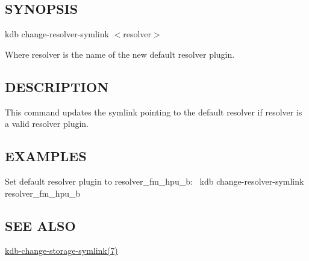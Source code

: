 \subsection*{S\+Y\+N\+O\+P\+S\+IS}

{\ttfamily kdb change-\/resolver-\/symlink $<$resolver$>$}

Where {\ttfamily resolver} is the name of the new default resolver plugin.

\subsection*{D\+E\+S\+C\+R\+I\+P\+T\+I\+ON}

This command updates the symlink pointing to the default resolver if {\ttfamily resolver} is a valid resolver plugin.

\subsection*{E\+X\+A\+M\+P\+L\+ES}

Set default resolver plugin to resolver\+\_\+fm\+\_\+hpu\+\_\+b\+:~\newline
 {\ttfamily kdb change-\/resolver-\/symlink resolver\+\_\+fm\+\_\+hpu\+\_\+b}

\subsection*{S\+EE A\+L\+SO}


\begin{DoxyItemize}
\item \hyperlink{doc_help_kdb-change-storage-symlink_md}{kdb-\/change-\/storage-\/symlink(7)} 
\end{DoxyItemize}